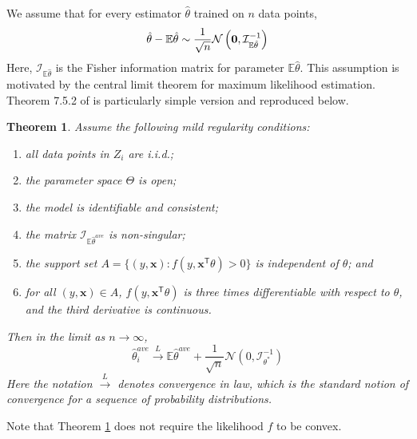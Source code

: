 \documentclass[twoside]{article}
\newtheorem{theorem}{Theorem}
\newcommand{\zero}{\text{\textbf{0}}}
\newcommand{\E}{\mathbb{E}}
\newcommand{\x}{\mathbf{x}}
\newcommand{\w}{\theta}
\newcommand{\wave}{\hat\w^{ave}}
\newcommand{\wtave}{\E\hat\w^{ave}}
\newcommand{\wmle}{\hat\w^{mle}}
\newcommand{\wstar}{{\w^{*}}}
\newcommand{\I}{\mathcal I}
\newcommand{\law}{\ensuremath{\xrightarrow{L}}}
\newcommand{\normal}[2]{\ensuremath{\mathcal{N}\left({{#1}},{{#2}}\right)}}
\newcommand{\trans}[1]{\ensuremath{{#1}^{\mathsf{T}}}}
\begin{document}
We assume that for every estimator $\hat\w$ trained on $n$ data points,
\begin{equation}
\label{eq:assumption}
\hat\w - \E\hat\w \sim \frac{1}{\sqrt n}\normal{\zero}{\I^{-1}_{\E\hat\w}}
\end{equation}
%
Here, $\I_{\E\hat\w}$ is the Fisher information matrix for parameter $\E\hat\w$.
This assumption is motivated by the central limit theorem for maximum likelihood estimation.
Theorem 7.5.2 of \cite{lehmann1999elements} is particularly simple version and reproduced below.
\begin{theorem}
\label{thm:clt}
Assume the following mild regularity conditions:
\begin{enumerate}[noitemsep,topsep=0pt]%
\item all data points in $Z_i$ are i.i.d.;
\item the parameter space $\Theta$ is open;
\item the model is identifiable and consistent;
\item the matrix $\I_{\wtave}$ is non-singular;
\item the support set $A = \{(y,\x) : f(y,\trans\x\theta) > 0\}$ is independent of $\theta$;
and \item for all $(y,\x)\in A$, $f(y,\trans\x\theta)$ is three times differentiable with respect to $\theta$,
and the third derivative is continuous.
\end{enumerate}
Then in the limit as $n\to\infty$,
\begin{equation*}
\wave_i \law \wtave + \frac{1}{\sqrt n} \normal{0}{\I^{-1}_\wstar}
\end{equation*}
Here the notation $\law$ denotes convergence in law,
which is the standard notion of convergence for a sequence of probability distributions.
\end{theorem}

Note that Theorem \ref{thm:clt} does not require the likelihood $f$ to be convex.
\end{document}
